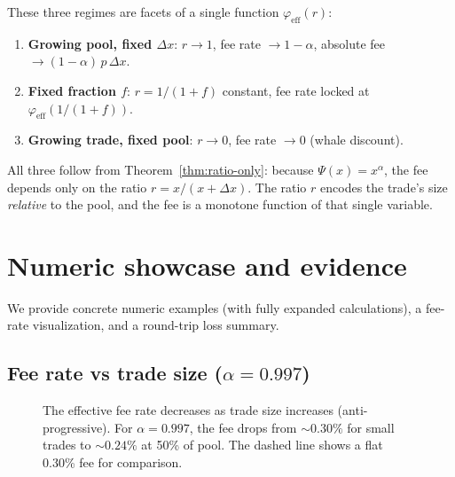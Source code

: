 \documentclass[11pt]{article}
\theoremstyle{definition}
\theoremstyle{remark}
\newcommand{\dx}{\Delta x}
\begin{document}
These three regimes are facets of a single function $\varphi_{\mathrm{eff}}(r)$:
\begin{enumerate}
\item \textbf{Growing pool, fixed $\dx$}: $r\to 1$, fee rate $\to 1{-}\alpha$, absolute fee $\to (1{-}\alpha)\,p\,\dx$.
\item \textbf{Fixed fraction $f$}: $r=1/(1{+}f)$ constant, fee rate locked at $\varphi_{\mathrm{eff}}(1/(1{+}f))$.
\item \textbf{Growing trade, fixed pool}: $r\to 0$, fee rate $\to 0$ (whale discount).
\end{enumerate}
All three follow from Theorem~\ref{thm:ratio-only}: because $\Psi(x)=x^\alpha$, the fee depends only on the ratio $r=x/(x{+}\dx)$.
The ratio $r$ encodes the trade's size \emph{relative} to the pool, and the fee is a monotone function of that single variable.


\section{Numeric showcase and evidence}
We provide concrete numeric examples (with fully expanded calculations), a fee-rate visualization, and a round-trip loss summary.

\subsection{Fee rate vs trade size ($\alpha=0.997$)}

\begin{figure}[htbp]
\centering
{}
\caption{The effective fee rate decreases as trade size increases (anti-progressive). For $\alpha=0.997$, the fee drops from $\sim\!0.30\%$ for small trades to $\sim\!0.24\%$ at 50\% of pool. The dashed line shows a flat 0.30\% fee for comparison.}
\label{fig:fee-rate}
\end{figure}
\end{document}
